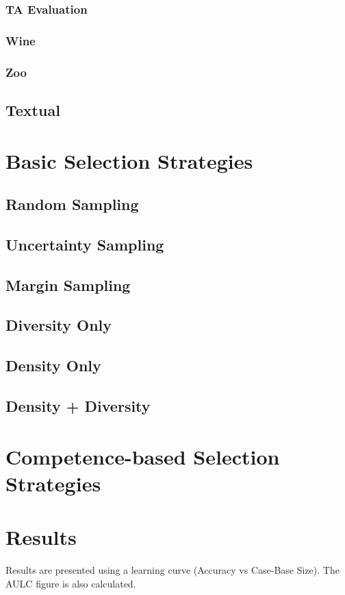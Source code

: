 \documentclass[a4paper,11pt]{report}
\begin{document}
\subsubsection*{TA Evaluation}\label{sec:taevaluation}
\subsubsection*{Wine}\label{sec:wine}
\subsubsection*{Zoo}\label{sec:zoo}
\subsection{Textual}

\section{Basic Selection Strategies}
\subsection{Random Sampling}
\subsection{Uncertainty Sampling}
\subsection{Margin Sampling}
\subsection{Diversity Only}
\subsection{Density Only}
\subsection{Density + Diversity}

\section{Competence-based Selection Strategies}

\section{Results}
Results are presented using a learning curve (Accuracy vs Case-Base Size). The AULC figure is also calculated.
\end{document}
